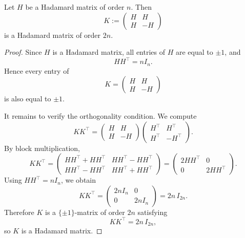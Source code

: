 \documentclass[11pt, a4paper]{ctexrep}
\begin{document}
\begin{proposition}\label{prop:sylvester-construction}
    Let $H$ be a Hadamard matrix of order $n$. Then
    \[
        K:=
        \begin{pmatrix}
            H & H  \\
            H & -H
        \end{pmatrix}
    \]
    is a Hadamard matrix of order $2n$.
\end{proposition}

\begin{proof}
    Since $H$ is a Hadamard matrix, all entries of $H$ are equal to $\pm 1$, and
    \[
        HH^{\top}=nI_n.
    \]
    Hence every entry of
    \[
        K=
        \begin{pmatrix}
            H & H  \\
            H & -H
        \end{pmatrix}
    \]
    is also equal to $\pm 1$.

    It remains to verify the orthogonality condition. We compute
    \[
        KK^{\top}
        =
        \begin{pmatrix}
            H & H  \\
            H & -H
        \end{pmatrix}
        \begin{pmatrix}
            H^{\top} & H^{\top}  \\
            H^{\top} & -H^{\top}
        \end{pmatrix}.
    \]
    By block multiplication,
    \[
        KK^{\top}
        =
        \begin{pmatrix}
            HH^{\top}+HH^{\top} & HH^{\top}-HH^{\top} \\
            HH^{\top}-HH^{\top} & HH^{\top}+HH^{\top}
        \end{pmatrix}
        =
        \begin{pmatrix}
            2HH^{\top} & 0          \\
            0          & 2HH^{\top}
        \end{pmatrix}.
    \]
    Using $HH^{\top}=nI_n$, we obtain
    \[
        KK^{\top}
        =
        \begin{pmatrix}
            2nI_n & 0     \\
            0     & 2nI_n
        \end{pmatrix}
        =
        2n\,I_{2n}.
    \]
    Therefore $K$ is a $\{\pm1\}$-matrix of order $2n$ satisfying
    \[
        KK^{\top}=2n\,I_{2n},
    \]
    so $K$ is a Hadamard matrix.
\end{proof}
\end{document}
